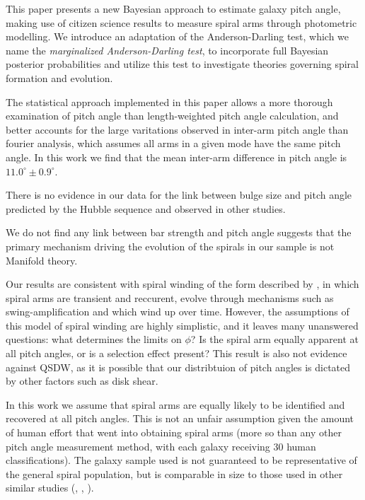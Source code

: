 This paper presents a new Bayesian approach to estimate galaxy pitch angle, making use of citizen science results to measure spiral arms through photometric modelling. We introduce an adaptation of the Anderson-Darling test, which we name the \textit{marginalized Anderson-Darling test}, to incorporate full Bayesian posterior probabilities and utilize this test to investigate theories governing spiral formation and evolution.

The statistical approach implemented in this paper allows a more thorough examination of pitch angle than length-weighted pitch angle calculation, and better accounts for the large varitations observed in inter-arm pitch angle than fourier analysis, which assumes all arms in a given mode have the same pitch angle. In this work we find that the mean inter-arm difference in pitch angle is $11.0^\circ\pm 0.9^\circ$.

There is no evidence in our data for the link between bulge size and pitch angle predicted by the Hubble sequence and observed in other studies.

We do not find any link between bar strength and pitch angle suggests that the primary mechanism driving the evolution of the spirals in our sample is not Manifold theory.

Our results are consistent with spiral winding of the form described by \citet{2019arXiv190910291P}, in which spiral arms are transient and reccurent, evolve through mechanisms such as swing-amplification \citep{1965MNRAS.130..125G} and which wind up over time. However, the assumptions of this model of spiral winding are highly simplistic, and it leaves many unanswered questions: what determines the limits on $\phi$? Is the spiral arm equally apparent at all pitch angles, or is a selection effect present? This result is also not evidence against QSDW, as it is possible that our distribtuion of pitch angles is dictated by other factors such as disk shear.

In this work we assume that spiral arms are equally likely to be identified and recovered at all pitch angles. This is not an unfair assumption given the amount of human effort that went into obtaining spiral arms (more so than any other pitch angle measurement method, with each galaxy receiving 30 human classifications). The galaxy sample used is not guaranteed to be representative of the general spiral population, but is comparable in size to those used in other similar studies (\citealt{2013MNRAS.436.1074S}, \citealt{2019ApJ...871..194Y}, \citealt{2019arXiv190910291P}).

